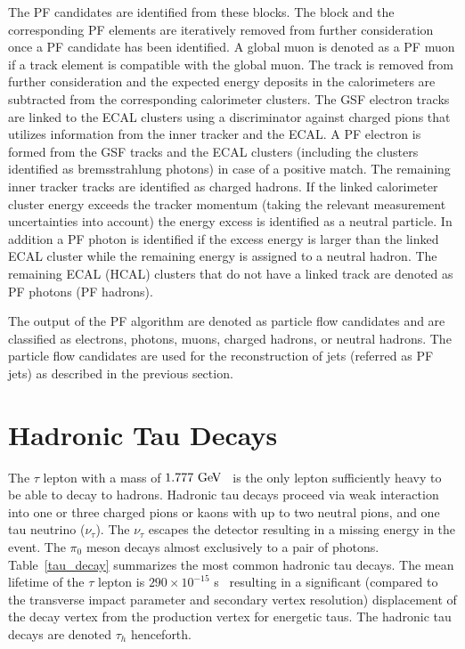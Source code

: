  The PF candidates are identified from these blocks. The block and the corresponding PF elements are iteratively removed from further consideration once a PF candidate has been identified. A global muon is denoted as a PF muon if a track element is compatible with the global muon. The track is removed from further consideration and the expected energy deposits in the calorimeters are subtracted from the corresponding calorimeter clusters.  The GSF electron tracks are linked to the ECAL clusters using a discriminator against charged pions that utilizes information from the inner tracker and the ECAL. A PF electron is formed from the GSF tracks and the ECAL clusters (including the clusters identified as bremsstrahlung photons) in case of a positive match. The remaining inner tracker tracks are identified as charged hadrons. If the linked calorimeter cluster energy exceeds the tracker momentum (taking the relevant measurement uncertainties into account) the energy excess is identified as a neutral particle. In addition a PF photon is identified if the excess energy is larger than the linked ECAL cluster while the remaining energy is assigned to a neutral hadron. The remaining ECAL (HCAL) clusters that do not have a linked track are denoted as PF photons (PF hadrons).   
 
 The output of the PF algorithm are denoted as particle flow candidates and are classified as electrons, photons, muons, charged hadrons, or neutral hadrons. The particle flow candidates are used for the reconstruction of jets (referred as PF jets) as described in the previous section.  

\section{Hadronic Tau Decays}

The $\tau$ lepton with a mass of $1.777~\mathrm{Ge\kern -0.1em V}$~\cite{Agashe:2014kda} is the only lepton sufficiently heavy to be able to decay to hadrons.  Hadronic tau decays proceed via weak interaction into one or three charged pions or kaons with up to two neutral pions, and one tau neutrino ($\nu_{\tau}$). The $\nu_{\tau}$ escapes the detector resulting in a missing energy in the event. The $\pi_{0}$ meson decays almost exclusively to a pair of photons. Table~\ref{tau_decay} summarizes the most common hadronic tau decays. The mean lifetime of the $\tau$ lepton is $290\times10^{-15}$ s~\cite{Agashe:2014kda} resulting in a significant (compared to the transverse impact parameter and secondary vertex resolution) displacement of the decay vertex from the production vertex for energetic taus. The hadronic tau decays are denoted $\tau_{h}$ henceforth.

